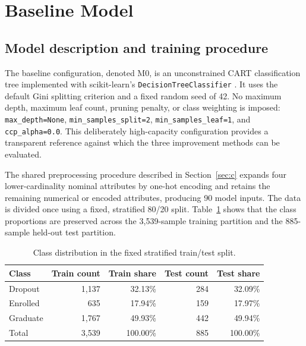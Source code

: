 
\section{Baseline Model}
\label{sec:d}

\subsection{Model description and training procedure}

The baseline configuration, denoted M0, is an unconstrained CART
classification tree implemented with scikit-learn's
\texttt{DecisionTreeClassifier} \citep{breiman1984classification,pedregosa2011scikit}.
It uses the default Gini splitting criterion and a fixed random seed of 42.
No maximum depth, maximum leaf count, pruning penalty, or class weighting is
imposed: \texttt{max\_depth=None}, \texttt{min\_samples\_split=2},
\texttt{min\_samples\_leaf=1}, and \texttt{ccp\_alpha=0.0}. This deliberately
high-capacity configuration provides a transparent reference against which the
three improvement methods can be evaluated.

The shared preprocessing procedure described in Section~\ref{sec:c} expands
four lower-cardinality nominal attributes by one-hot encoding and retains the
remaining numerical or encoded attributes, producing 90 model inputs. The data
is divided once using a fixed, stratified 80/20 split. Table~\ref{tab:d-split}
shows that the class proportions are preserved across the 3{,}539-sample
training partition and the 885-sample held-out test partition.

\begin{table}[H]
  \centering
  \caption{Class distribution in the fixed stratified train/test split.}
  \label{tab:d-split}
  \begin{tabular}{@{}lrrrr@{}}
    \toprule
    Class & Train count & Train share & Test count & Test share \\
    \midrule
    Dropout  & 1{,}137 & 32.13\% & 284 & 32.09\% \\
    Enrolled & 635     & 17.94\% & 159 & 17.97\% \\
    Graduate & 1{,}767 & 49.93\% & 442 & 49.94\% \\
    \midrule
    Total    & 3{,}539 & 100.00\% & 885 & 100.00\% \\
    \bottomrule
  \end{tabular}
\end{table}

